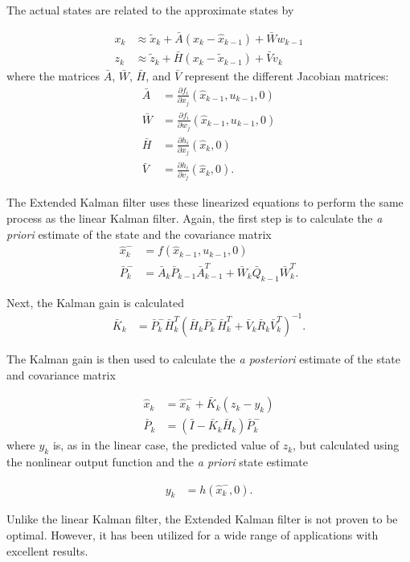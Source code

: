 The actual states are related to the approximate states by

\begin{align}
x_k &\approx\tilde{x}_k+\bar{A}(x_k-\hat{x}_{k-1})+\bar{W}w_{k-1}\\
z_k &\approx\tilde{z}_k+\bar{H}(x_k-\tilde{x}_{k-1})+\bar{V}v_k
\end{align}
\noindent
where  the matrices $\bar{A}$, $\bar{W}$, $\bar{H}$, and $\bar{V}$ represent the different Jacobian matrices:
\begin{align}
\bar{A} &= \frac{\partial f_i}{\partial x_j}(\hat{x}_{k-1},u_{k-1},0)\\
\bar{W} &= \frac{\partial f_i}{\partial w_j}(\hat{x}_{k-1},u_{k-1},0)\\
\bar{H} &= \frac{\partial h_i}{\partial x_j}(\hat{x}_{k},0)\\
\bar{V} &= \frac{\partial h_i}{\partial v_j}(\hat{x}_{k},0).
\end{align}

The Extended Kalman filter uses these linearized equations to perform the same process as the linear Kalman filter. Again, the first step is to calculate the \textit{a priori} estimate of the state and the covariance matrix
\begin{align}
\hat{x}^-_k &=f(\hat{x}_{k-1},u_{k-1},0)\\
\bar{P}^-_k  &= \bar{A}_k\bar{P}_{k-1}\bar{A}^T_{k-1}+\bar{W}_k\bar{Q}_{k-1}\bar{W}^T_k.
\end{align}

Next, the Kalman gain is calculated
\begin{align}
\bar{K}_k &=\bar{P}^-_k\bar{H}^T_k(\bar{H}_k\bar{P}^-_k\bar{H}^T_k+\bar{V}_k\bar{R}_k\bar{V}^T_k)^{-1}.
\end{align}

The Kalman gain is then used to calculate the \textit{a posteriori} estimate of the state and covariance matrix

\begin{align}
\hat{x}_k &=\hat{x}^-_{k}+\bar{K}_k(z_k-y_k)\\
\label{kalmanVariance}
\bar{P}_k &=(\bar{I}-\bar{K}_k\bar{H}_k)\bar{P}^-_k
\end{align}
\noindent
where $y_k$ is, as in the linear case, the predicted value of $z_k$, but calculated using the nonlinear output function and the \textit{a priori} state estimate

\begin{align}
y_k &= h(\hat{x}^-_k,0).
\end{align}

Unlike the linear Kalman filter, the Extended Kalman filter is not proven to be optimal. However, it has been utilized for a wide range of applications with excellent results.
